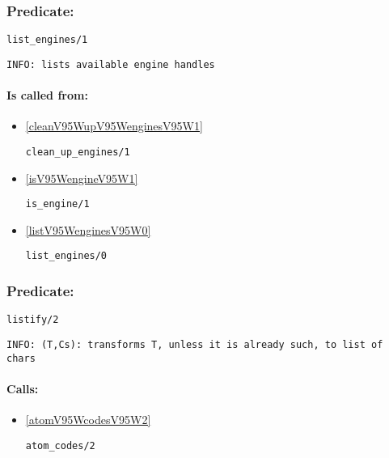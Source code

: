 \subsubsection{Predicate:} \label{listV95WenginesV95W1}

\begin{verbatim}
list_engines/1
\end{verbatim}

{\small \begin{verbatim}
INFO: lists available engine handles

\end{verbatim}}
\paragraph{Is called from:} 
\begin{itemize}
\item \ref{cleanV95WupV95WenginesV95W1} 
\begin{verbatim}
clean_up_engines/1
\end{verbatim}

\item \ref{isV95WengineV95W1} 
\begin{verbatim}
is_engine/1
\end{verbatim}

\item \ref{listV95WenginesV95W0} 
\begin{verbatim}
list_engines/0
\end{verbatim}

\end{itemize}

\subsubsection{Predicate:} \label{listifyV95W2}

\begin{verbatim}
listify/2
\end{verbatim}

{\small \begin{verbatim}
INFO: (T,Cs): transforms T, unless it is already such, to list of chars

\end{verbatim}}
\paragraph{Calls:} 
\begin{itemize}
\item \ref{atomV95WcodesV95W2} 
\begin{verbatim}
atom_codes/2
\end{verbatim}

\end{itemize}

